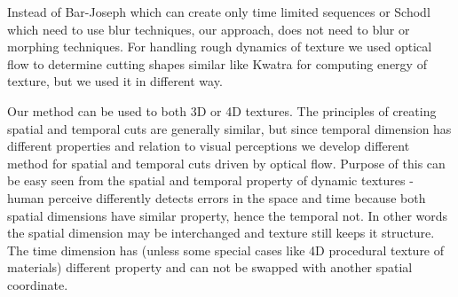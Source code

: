 	Instead of Bar-Joseph \cite{Bar-joseph01texturemixing} which can create only time limited sequences or Schodl\cite{Schodl00videotextures} which need to use blur techniques, our approach, does not need to blur or morphing techniques. For handling rough dynamics of texture we used optical flow \cite{Beauchemin95thecomputation,Horn81determiningoptical,Nitsuwat_opticalflow,Vidal05opticalflow} to determine cutting shapes similar like Kwatra \cite{Kwatra05textureoptimization} for computing energy of texture, but we used it in different way.

		Our method can be used to both 3D or 4D textures. The principles of creating spatial and temporal cuts are generally similar, but since temporal dimension has different properties and relation to visual perceptions we develop different method for spatial and temporal cuts driven by optical flow. Purpose of this can be easy seen from the spatial and temporal property of dynamic textures - human perceive differently detects errors in the space and time \cite{Edelman92visualperception} because both spatial dimensions have similar property, hence the temporal not\cite{Fahle81spatiotemporalinterpolation}. In other words the spatial dimension may be interchanged and texture still keeps it structure. The time dimension has (unless some special cases like 4D procedural texture of materials) different property and can not be swapped with another spatial coordinate.
		
		
		
		
		
		
		
		
